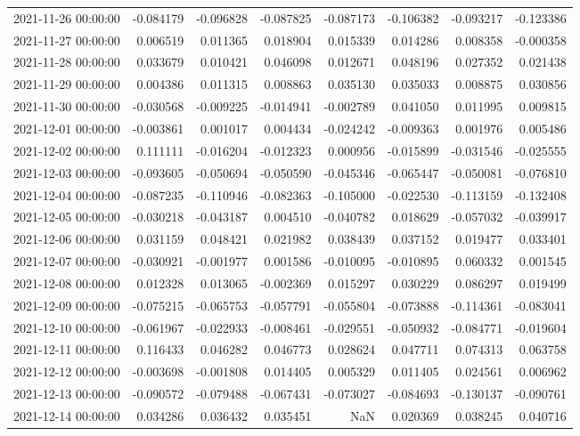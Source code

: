 \begin{tabular}{lrrrrrrr}
2021-11-26 00:00:00 & -0.084179 & -0.096828 & -0.087825 & -0.087173 & -0.106382 & -0.093217 & -0.123386 \\
2021-11-27 00:00:00 & 0.006519 & 0.011365 & 0.018904 & 0.015339 & 0.014286 & 0.008358 & -0.000358 \\
2021-11-28 00:00:00 & 0.033679 & 0.010421 & 0.046098 & 0.012671 & 0.048196 & 0.027352 & 0.021438 \\
2021-11-29 00:00:00 & 0.004386 & 0.011315 & 0.008863 & 0.035130 & 0.035033 & 0.008875 & 0.030856 \\
2021-11-30 00:00:00 & -0.030568 & -0.009225 & -0.014941 & -0.002789 & 0.041050 & 0.011995 & 0.009815 \\
2021-12-01 00:00:00 & -0.003861 & 0.001017 & 0.004434 & -0.024242 & -0.009363 & 0.001976 & 0.005486 \\
2021-12-02 00:00:00 & 0.111111 & -0.016204 & -0.012323 & 0.000956 & -0.015899 & -0.031546 & -0.025555 \\
2021-12-03 00:00:00 & -0.093605 & -0.050694 & -0.050590 & -0.045346 & -0.065447 & -0.050081 & -0.076810 \\
2021-12-04 00:00:00 & -0.087235 & -0.110946 & -0.082363 & -0.105000 & -0.022530 & -0.113159 & -0.132408 \\
2021-12-05 00:00:00 & -0.030218 & -0.043187 & 0.004510 & -0.040782 & 0.018629 & -0.057032 & -0.039917 \\
2021-12-06 00:00:00 & 0.031159 & 0.048421 & 0.021982 & 0.038439 & 0.037152 & 0.019477 & 0.033401 \\
2021-12-07 00:00:00 & -0.030921 & -0.001977 & 0.001586 & -0.010095 & -0.010895 & 0.060332 & 0.001545 \\
2021-12-08 00:00:00 & 0.012328 & 0.013065 & -0.002369 & 0.015297 & 0.030229 & 0.086297 & 0.019499 \\
2021-12-09 00:00:00 & -0.075215 & -0.065753 & -0.057791 & -0.055804 & -0.073888 & -0.114361 & -0.083041 \\
2021-12-10 00:00:00 & -0.061967 & -0.022933 & -0.008461 & -0.029551 & -0.050932 & -0.084771 & -0.019604 \\
2021-12-11 00:00:00 & 0.116433 & 0.046282 & 0.046773 & 0.028624 & 0.047711 & 0.074313 & 0.063758 \\
2021-12-12 00:00:00 & -0.003698 & -0.001808 & 0.014405 & 0.005329 & 0.011405 & 0.024561 & 0.006962 \\
2021-12-13 00:00:00 & -0.090572 & -0.079488 & -0.067431 & -0.073027 & -0.084693 & -0.130137 & -0.090761 \\
2021-12-14 00:00:00 & 0.034286 & 0.036432 & 0.035451 & NaN & 0.020369 & 0.038245 & 0.040716 \\

\end{tabular}

